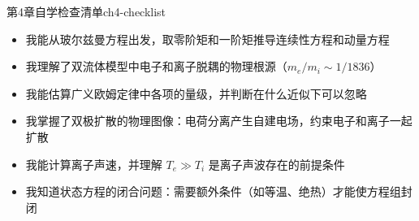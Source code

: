 \begin{checklistbox}{第4章自学检查清单}{ch4-checklist}
\begin{itemize}[leftmargin=*,label=$\square$]
\item 我能从玻尔兹曼方程出发，取零阶矩和一阶矩推导连续性方程和动量方程
\item 我理解了双流体模型中电子和离子脱耦的物理根源（$m_e/m_i\sim 1/1836$）
\item 我能估算广义欧姆定律中各项的量级，并判断在什么近似下可以忽略
\item 我掌握了双极扩散的物理图像：电荷分离产生自建电场，约束电子和离子一起扩散
\item 我能计算离子声速，并理解 $T_e\gg T_i$ 是离子声波存在的前提条件
\item 我知道状态方程的闭合问题：需要额外条件（如等温、绝热）才能使方程组封闭
\end{itemize}
\end{checklistbox}

\endinput
